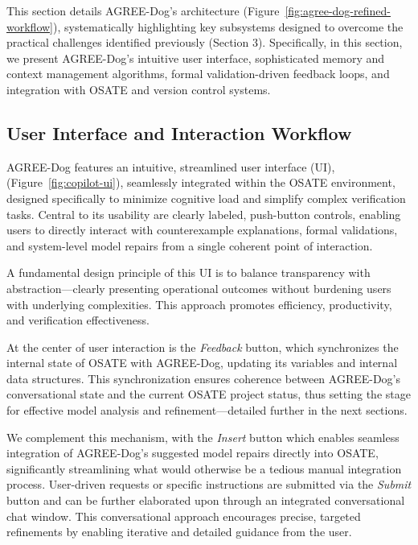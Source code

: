 \label{sec:design-architecture}

This section details AGREE-Dog’s architecture (Figure~\ref{fig:agree-dog-refined-workflow}), systematically highlighting key subsystems designed to overcome the practical challenges identified previously (Section 3). 
%
Specifically, in this section, we present AGREE-Dog’s intuitive user interface, sophisticated memory and context management algorithms, formal validation-driven feedback loops, and integration with OSATE and version control systems.



\subsection{User Interface and Interaction Workflow}
AGREE-Dog features an intuitive, streamlined user interface (UI), (Figure~\ref{fig:copilot-ui}), seamlessly integrated within the OSATE environment, designed specifically to minimize cognitive load and simplify complex verification tasks. Central to its usability are clearly labeled, push-button controls, enabling users to directly interact with counterexample explanations, formal validations, and system-level model repairs from a single coherent point of interaction.

A fundamental design principle of this UI is to balance transparency with abstraction—clearly presenting operational outcomes without burdening users with underlying complexities. This approach promotes efficiency, productivity, and verification effectiveness.

At the center of user interaction is the \textit{Feedback} button, which synchronizes the internal state of OSATE with AGREE-Dog, updating its variables and internal data structures. This synchronization ensures coherence between AGREE-Dog's conversational state and the current OSATE project status, thus setting the stage for effective model analysis and refinement—detailed further in the next sections.%
%

We complement this mechanism, with the \textit{Insert} button which enables seamless integration of AGREE-Dog’s suggested model repairs directly into OSATE,
significantly streamlining what would otherwise be a tedious manual integration process.
%
User-driven requests or specific instructions are submitted via the \textit{Submit} button and can be further elaborated upon through an integrated conversational chat window. This conversational approach encourages precise, targeted refinements by enabling iterative and detailed guidance from the user.


